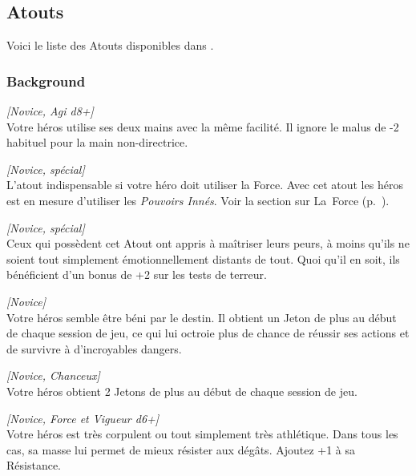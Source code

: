 \subsection{Atouts}

Voici le liste des Atouts disponibles dans \swr.

\subsubsection{Background}
\begin{description}[align=left]
    \item [Ambidextre]
    	\emph{[Novice, Agi d8+]}\\
        Votre héros utilise ses deux mains avec la même facilité. Il ignore le malus de -2 habituel pour la main non-directrice.

    \item [Arcane (Force)]
    	\emph{[Novice, spécial]}\\
        L’atout indispensable si votre héro doit utiliser la Force. Avec cet atout les héros est en mesure d’utiliser les \emph{Pouvoirs Innés}. Voir la section sur La~Force (p.~\pageref{sec:force}).

    \item [Brave]
    	\emph{[Novice, spécial]}\\
        Ceux qui possèdent cet Atout ont appris à maîtriser leurs peurs, à moins qu’ils ne soient tout simplement émotionnellement distants de tout. Quoi qu’il en soit, ils bénéficient d’un bonus de +2 sur les tests de terreur.

    \item [Chanceux]
    	\emph{[Novice]}\\
        Votre héros semble être béni par le destin. Il obtient un Jeton de plus au début de chaque session de jeu, ce qui lui octroie plus de chance de réussir ses actions et de survivre à d’incroyables dangers.

    \item [Très Chanceux]
    	\emph{[Novice, Chanceux]}\\
        Votre héros obtient 2 Jetons de plus au début de chaque session de jeu.

    \item [Costaud]
    	\emph{[Novice, Force et Vigueur d6+]}\\
        Votre héros est très corpulent ou tout simplement très athlétique. Dans tous les cas, sa masse lui permet de mieux résister aux dégâts. Ajoutez +1 à sa Résistance.


\end{description}
